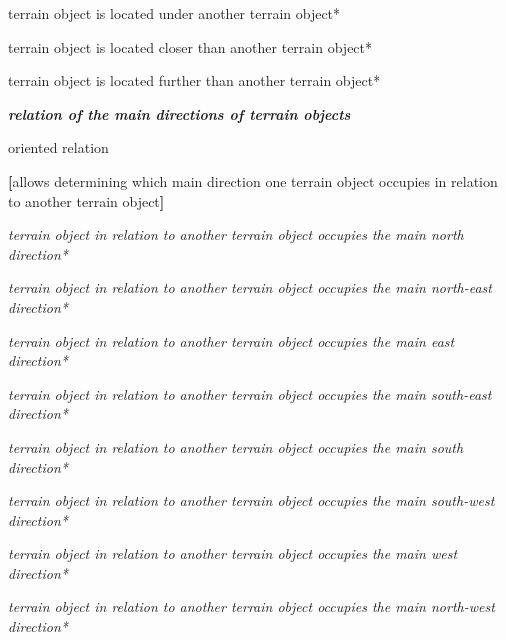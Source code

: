 \documentclass{article}
\date{}
\begin{document}
\begin{multicols}{2}

    \begin{description}[leftmargin=!, labelwidth=1cm, itemsep=-1.5mm]
        \item[$\supset$] terrain object is located under another terrain object*
        \item[$\supset$] terrain object is located closer than another terrain object*
        \item[$\supset$] terrain object is located further than another terrain object*
    \end{description}

    \noindent \textit{\textbf{relation of the main directions of terrain objects}}
    \vspace{-0.3cm}
    \begin{description}[leftmargin=!, labelwidth=1cm, itemsep=-1.5mm]
        \item[$\subset$] oriented relation
        \item[$\coloneqq$] \textbf{[}allows determining which main direction one terrain object occupies in relation to another terrain object\textbf{]}
        \item[$\supset$] \textit{terrain object in relation to another terrain object occupies the main north direction*}
        \item[$\supset$] \textit{terrain object in relation to another terrain object occupies the main north-east direction*}
        \item[$\supset$] \textit{terrain object in relation to another terrain object occupies the main east direction*}
        \item[$\supset$] \textit{terrain object in relation to another terrain object occupies the main south-east direction*}
        \item[$\supset$] \textit{terrain object in relation to another terrain object occupies the main south direction*}
        \item[$\supset$] \textit{terrain object in relation to another terrain object occupies the main south-west direction*}
        \item[$\supset$] \textit{terrain object in relation to another terrain object occupies the main west direction*}
        \item[$\supset$] \textit{terrain object in relation to another terrain object occupies the main north-west direction*}
    \end{description}


\end{multicols}
\end{document}
